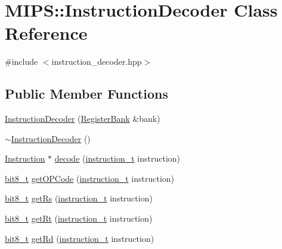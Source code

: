 \hypertarget{classMIPS_1_1InstructionDecoder}{}\section{M\+I\+PS\+:\+:Instruction\+Decoder Class Reference}
\label{classMIPS_1_1InstructionDecoder}


{\ttfamily \#include $<$instruction\+\_\+decoder.\+hpp$>$}

\subsection*{Public Member Functions}
\begin{DoxyCompactItemize}
\item 
\hyperlink{classMIPS_1_1InstructionDecoder_a81c1e3f43edf65ca86dba43a9090c9fc}{Instruction\+Decoder} (\hyperlink{classMIPS_1_1RegisterBank}{Register\+Bank} \&bank)
\item 
\hyperlink{classMIPS_1_1InstructionDecoder_a148a38deb0745a55bbd927d186f93c89}{$\sim$\+Instruction\+Decoder} ()
\item 
\hyperlink{classMIPS_1_1Instruction}{Instruction} $\ast$ \hyperlink{classMIPS_1_1InstructionDecoder_adf51f7da13d3256b60d99384cdc4af63}{decode} (\hyperlink{core_8hpp_aa514fd240a0e29abb2a2e4c805d7f1a4}{instruction\+\_\+t} instruction)
\item 
\hyperlink{core_8hpp_a6074bae122ae7b527864eec42c728c3c}{bit8\+\_\+t} \hyperlink{classMIPS_1_1InstructionDecoder_a9ba2a37411b5e8d4e7b03c4d5b50399b}{get\+O\+P\+Code} (\hyperlink{core_8hpp_aa514fd240a0e29abb2a2e4c805d7f1a4}{instruction\+\_\+t} instruction)
\item 
\hyperlink{core_8hpp_a6074bae122ae7b527864eec42c728c3c}{bit8\+\_\+t} \hyperlink{classMIPS_1_1InstructionDecoder_a557dfb2243be5d1a0a369c333817fa86}{get\+Rs} (\hyperlink{core_8hpp_aa514fd240a0e29abb2a2e4c805d7f1a4}{instruction\+\_\+t} instruction)
\item 
\hyperlink{core_8hpp_a6074bae122ae7b527864eec42c728c3c}{bit8\+\_\+t} \hyperlink{classMIPS_1_1InstructionDecoder_a4da42498cc12ddcc041b42bacbc3b3a1}{get\+Rt} (\hyperlink{core_8hpp_aa514fd240a0e29abb2a2e4c805d7f1a4}{instruction\+\_\+t} instruction)
\item 
\hyperlink{core_8hpp_a6074bae122ae7b527864eec42c728c3c}{bit8\+\_\+t} \hyperlink{classMIPS_1_1InstructionDecoder_a493aeaf3390fb5821596ef3efc22e65b}{get\+Rd} (\hyperlink{core_8hpp_aa514fd240a0e29abb2a2e4c805d7f1a4}{instruction\+\_\+t} instruction)

\end{DoxyCompactItemize}
